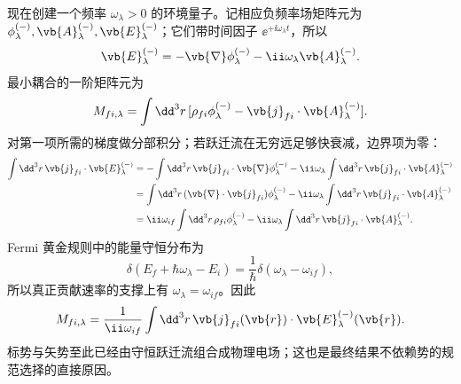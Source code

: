 \begin{derivation}[跃迁电流与环境激发率]
现在创建一个频率 $\omega_\lambda>0$ 的环境量子。记相应负频率场矩阵元为
$\phi_\lambda^{(-)},\vb{A}_\lambda^{(-)},\vb{E}_\lambda^{(-)}$；它们带时间因子
$\ee^{+\ii\omega_\lambda t}$，所以
\begin{equation*}
\vb{E}_\lambda^{(-)}
=-\vb{\nabla}\phi_\lambda^{(-)}
-\ii\omega_\lambda\vb{A}_\lambda^{(-)}.
\end{equation*}
最小耦合的一阶矩阵元为
\begin{equation*}
M_{fi,\lambda}
=\int\dd^3 r\,
[\rho_{fi}\phi_\lambda^{(-)}
-\vb{j}_{fi}\cdot\vb{A}_\lambda^{(-)}].
\end{equation*}
对第一项所需的梯度做分部积分；若跃迁流在无穷远足够快衰减，边界项为零：
\begin{align*}
\int\dd^3 r\,\vb{j}_{fi}\cdot\vb{E}_\lambda^{(-)}
&=-\int\dd^3r\,\vb{j}_{fi}\cdot\vb{\nabla}\phi_\lambda^{(-)}
-\ii\omega_\lambda\int\dd^3r\,\vb{j}_{fi}\cdot\vb{A}_\lambda^{(-)}\\
&=\int\dd^3r\,
(\vb{\nabla}\cdot\vb{j}_{fi})\phi_\lambda^{(-)}
-\ii\omega_\lambda\int\dd^3r\,\vb{j}_{fi}\cdot\vb{A}_\lambda^{(-)}\\
&=\ii\omega_{if}\int\dd^3r\,\rho_{fi}\phi_\lambda^{(-)}
-\ii\omega_\lambda\int\dd^3r\,\vb{j}_{fi}\cdot\vb{A}_\lambda^{(-)}.
\end{align*}
Fermi 黄金规则中的能量守恒分布为
\begin{equation*}
\delta(E_f+\hbar\omega_\lambda-E_i)
=\frac1\hbar\delta(\omega_\lambda-\omega_{if}),
\end{equation*}
所以真正贡献速率的支撑上有 $\omega_\lambda=\omega_{if}$。因此
\begin{equation*}
{
M_{fi,\lambda}
=\frac{1}{\ii\omega_{if}}
\int\dd^3 r\,
\vb{j}_{fi}(\vb{r})\cdot
\vb{E}_\lambda^{(-)}(\vb{r})}.
\end{equation*}
标势与矢势至此已经由守恒跃迁流组合成物理电场；这也是最终结果不依赖势的规范选择的直接原因。


\end{derivation}
